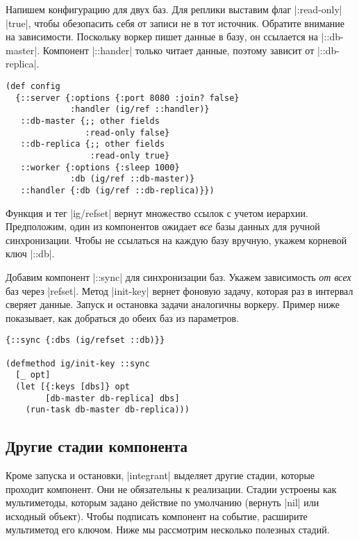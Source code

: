 Напишем конфигурацию для двух баз. Для реплики выставим флаг \spverb|:read-only|
\spverb|true|, чтобы обезопасить себя от записи не в тот источник. Обратите
внимание на зависимости. Поскольку воркер пишет данные в базу, он ссылается на
\spverb|::db-master|. Компонент \spverb|::hander| только читает данные, поэтому
зависит от \spverb|::db-replica|.

\begin{verbatim}
(def config
  {::server {:options {:port 8080 :join? false}
             :handler (ig/ref ::handler)}
   ::db-master {;; other fields
                :read-only false}
   ::db-replica {;; other fields
                 :read-only true}
   ::worker {:options {:sleep 1000}
             :db (ig/ref ::db-master)}
   ::handler {:db (ig/ref ::db-replica)}})
\end{verbatim}

Функция и тег \spverb|ig/refset| вернут множество ссылок с учетом
иерархии. Предположим, один из компонентов ожидает \emph{все} базы данных для
ручной синхронизации. Чтобы не ссылаться на каждую базу вручную, укажем корневой
ключ \spverb|::db|.

Добавим компонент \spverb|::sync| для синхронизации баз. Укажем зависимость
\emph{от всех} баз через \spverb|refset|. Метод \spverb|init-key| вернет фоновую
задачу, которая раз в интервал сверяет данные. Запуск и остановка задачи
аналогичны воркеру. Пример ниже показывает, как добраться до обеих баз из
параметров.


\begin{verbatim}
{::sync {:dbs (ig/refset ::db)}}

(defmethod ig/init-key ::sync
  [_ opt]
  (let [{:keys [dbs]} opt
        [db-master db-replica] dbs]
    (run-task db-master db-replica)))
\end{verbatim}

\subsection{Другие стадии компонента}


Кроме запуска и остановки, \spverb|integrant| выделяет другие стадии, которые
проходит компонент. Они не обязательны к реализации. Стадии устроены как
мультиметоды, которым задано действие по умолчанию (вернуть \spverb|nil| или
исходный объект). Чтобы подписать компонент на событие, расширите мультиметод
его ключом. Ниже мы рассмотрим несколько полезных стадий.


